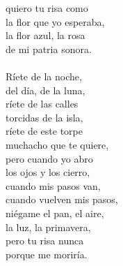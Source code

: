 \begin{Parallel}{0.48\textwidth}{0.48\textwidth}
{quiero tu risa como\\ 
la flor que yo esperaba,\\ 
la flor azul, la rosa\\ 
de mi patria sonora.\\ 
\-\ \\ Ríete de la noche,\\ 
del día, de la luna,\\ 
ríete de las calles\\ 
torcidas de la isla,\\ 
ríete de este torpe\\ 
muchacho que te quiere,\\ 
pero cuando yo abro\\ 
los ojos y los cierro,\\ 
cuando mis pasos van,\\ 
cuando vuelven mis pasos,\\ 
niégame el pan, el aire,\\ 
la luz, la primavera,\\ 
pero tu risa nunca\\ 
porque me moriría.}
\ParallelPar
\end{Parallel}